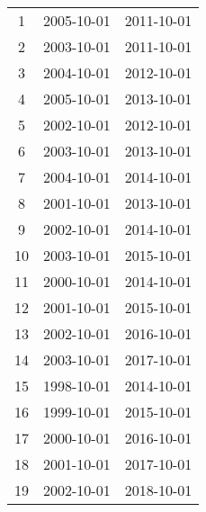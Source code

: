 % 
\begin{tabular}{ccc}
  \hline
  \hline
1 & 2005-10-01 & 2011-10-01 \\ 
  2 & 2003-10-01 & 2011-10-01 \\ 
  3 & 2004-10-01 & 2012-10-01 \\ 
  4 & 2005-10-01 & 2013-10-01 \\ 
  5 & 2002-10-01 & 2012-10-01 \\ 
  6 & 2003-10-01 & 2013-10-01 \\ 
  7 & 2004-10-01 & 2014-10-01 \\ 
  8 & 2001-10-01 & 2013-10-01 \\ 
  9 & 2002-10-01 & 2014-10-01 \\ 
  10 & 2003-10-01 & 2015-10-01 \\ 
  11 & 2000-10-01 & 2014-10-01 \\ 
  12 & 2001-10-01 & 2015-10-01 \\ 
  13 & 2002-10-01 & 2016-10-01 \\ 
  14 & 2003-10-01 & 2017-10-01 \\ 
  15 & 1998-10-01 & 2014-10-01 \\ 
  16 & 1999-10-01 & 2015-10-01 \\ 
  17 & 2000-10-01 & 2016-10-01 \\ 
  18 & 2001-10-01 & 2017-10-01 \\ 
  19 & 2002-10-01 & 2018-10-01 \\ 
   \hline
\end{tabular}
